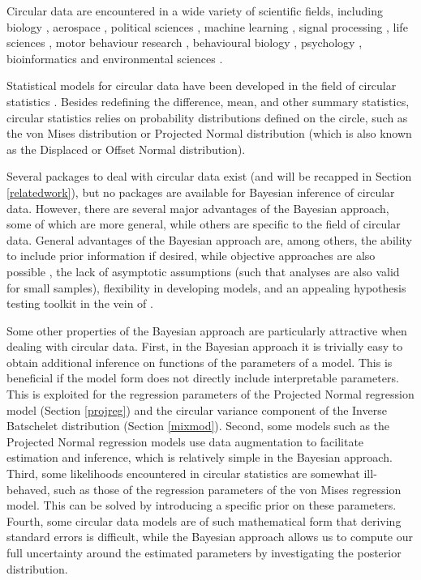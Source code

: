 Circular data are encountered in a wide variety of scientific fields,
including biology \citep{nunez2018bayesian}, aerospace
\citep{kurz2017deterministic}, political sciences \citep{gill2010},
machine learning \citep{gopal2014mises}, signal processing
\citep{traa2013wrapped}, life sciences \citep{mardianew}, motor
behaviour research
\citep{mechsner2001perceptual, mechsner2007bimanual, postma2008keep, baayen2012test},
behavioural biology \citep{bulbert2015danger}, psychology
\citep{Leary1957, gurtman2003circumplex, kaas2006haptic,  gurtman2009exploring},
bioinformatics \citep{mardia2008multivariate} and environmental sciences
\citep{lagona2016regression, lagona2015hidden, arnold2006recent}.

Statistical models for circular data have been developed in the field of
circular statistics
\citep{fisher1995statistical, jammalamadaka2001topics, mardia2009directional, pewsey2013circular, ley2017modern, ley2018applied}.
Besides redefining the difference, mean, and other summary statistics,
circular statistics relies on probability distributions defined on the
circle, such as the von Mises distribution \citep{von1918ganzzahligkeit}
or Projected Normal distribution \citep{Kendall1974} (which is also
known as the Displaced or Offset Normal distribution).

Several packages to deal with circular data exist (and will be recapped
in Section \ref{relatedwork}), but no packages are available for
Bayesian inference of circular data. However, there are several major
advantages of the Bayesian approach, some of which are more general,
while others are specific to the field of circular data. General
advantages of the Bayesian approach are, among others, the ability to
include prior information if desired, while objective approaches are
also possible \citep{berger2006case}, the lack of asymptotic assumptions
(such that analyses are also valid for small samples), flexibility in
developing models, and an appealing hypothesis testing toolkit in the
vein of \citet{jeffreys1961theory}.

Some other properties of the Bayesian approach are particularly
attractive when dealing with circular data. First, in the Bayesian
approach it is trivially easy to obtain additional inference on
functions of the parameters of a model. This is beneficial if the model
form does not directly include interpretable parameters. This is
exploited for the regression parameters of the Projected Normal
regression model (Section \ref{projreg}) and the circular variance
component of the Inverse Batschelet distribution (Section \ref{mixmod}).
Second, some models such as the Projected Normal regression models use
data augmentation to facilitate estimation and inference, which is
relatively simple in the Bayesian approach. Third, some likelihoods
encountered in circular statistics are somewhat ill-behaved, such as
those of the regression parameters of the von Mises regression model.
This can be solved by introducing a specific prior on these parameters.
Fourth, some circular data models are of such mathematical form that
deriving standard errors is difficult, while the Bayesian approach
allows us to compute our full uncertainty around the estimated
parameters by investigating the posterior distribution.

